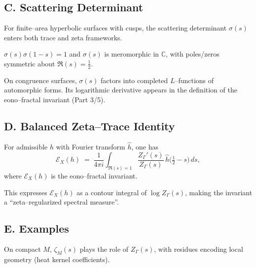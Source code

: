 \subsection*{C. Scattering Determinant}
\label{subsec:scattering}

For finite–area hyperbolic surfaces with cusps, the scattering determinant $\sigma(s)$ enters both trace and zeta frameworks.

\begin{theorem}
$\sigma(s)\sigma(1-s)=1$ and $\sigma(s)$ is meromorphic in $\mathbb C$, with poles/zeros symmetric about $\Re(s)=\tfrac12$.
\end{theorem}

\begin{remark}
On congruence surfaces, $\sigma(s)$ factors into completed $L$–functions of automorphic forms. Its logarithmic derivative appears in the definition of the eono–fractal invariant (Part 3/5).
\end{remark}

\subsection*{D. Balanced Zeta–Trace Identity}
\label{subsec:zeta-trace}

\begin{theorem}
For admissible $h$ with Fourier transform $\hat h$, one has
\[
  \mathcal E_X(h)
  \;=\;
  \frac{1}{4\pi i}\int_{\Re(s)=1} \frac{Z_\Gamma'(s)}{Z_\Gamma(s)}\,\hat h\!\Big(\tfrac12 - s\Big)\,ds,
\]
where $\mathcal E_X(h)$ is the eono–fractal invariant.
\end{theorem}

\begin{remark}[Interpretation]
This expresses $\mathcal E_X(h)$ as a contour integral of $\log Z_\Gamma(s)$, making the invariant a ``zeta–regularized spectral measure''.
\end{remark}

\subsection*{E. Examples}
\label{subsec:zeta-examples}

\begin{example}
On compact $M$, $\zeta_M(s)$ plays the role of $Z_\Gamma(s)$, with residues encoding local geometry (heat kernel coefficients).
\end{example}

